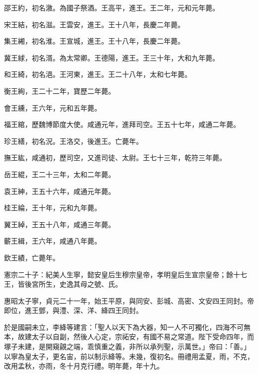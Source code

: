 \begin{pinyinscope}
 邵王約，初名漵。為國子祭酒。王高平，進王。王二年，元和元年薨。



 宋王結，初名滋。王雲安，進王。王十八年，長慶二年薨。



 集王緗，初名淮。王宣城，進王。王十八年，長慶二年薨。



 冀王絿，初名湑。為太常卿。王德陽，進王。王三十年，大和九年薨。



 和王綺，初名浥。王河東，進王。王二十八年，太和七年薨。



 衡王絢，王二十二年，寶歷二年薨。



 會王纁，王六年，元和五年薨。



 福王綰，歷魏博節度大使。咸通元年，進拜司空。王五十七年，咸通二年薨。



 珍王繕，初名況。王洛交，後進王。亡薨年。



 撫王紘，咸通初，歷司空，又進司徒、太尉。王七十三年，乾符三年薨。



 岳王緄，王二十三年，太和二年薨。



 袁王紳，王五十六年，咸通元年薨。



 桂王綸，王十年，元和九年薨。



 翼王綽，王五十八年，咸通三年薨。



 蘄王緝，王六年，咸通八年薨。



 欽王績，亡薨年。



 憲宗二十子：紀美人生寧，懿安皇后生穆宗皇帝，孝明皇后生宣宗皇帝；餘十七王，皆後宮所生，史逸其母之號、氏。



 惠昭太子寧，貞元二十一年，始王平原，與同安、彭城、高密、文安四王同封。帝即位，進王鄧，與澧、深、洋、絳四王同封。



 於是國嗣未立，李絳等建言：「聖人以天下為大器，知一人不可獨化，四海不可無本，故建太子以自副，然後人心定，宗祏安，有國不易之常道。陛下受命四年，而塚子未建，是開窺覦之端，乖慎重之義，非所以承列聖，示萬世。」帝曰：「善。」以寧為皇太子，更名宙，前以制示絳等。未幾，復初名。冊禮用孟夏，雨，不克，改用孟秋，亦雨，冬十月克行禮。明年薨，年十九。




\end{pinyinscope}
